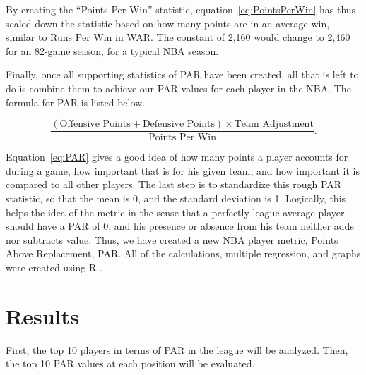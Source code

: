 \documentclass[12pt]{article}
\begin{document}
By creating the ``Points Per Win'' statistic, equation~\ref{eq:PointsPerWin} 
has thus scaled down the statistic based 
on how many points are in an average win, similar to Runs Per Win in 
WAR. The constant of 2,160 would change to 2,460 for an 82-game 
season, for a typical NBA season.

Finally, once all supporting statistics of PAR have been created, all that is left to 
do is combine them to achieve our PAR values for each player in the 
NBA. The formula for PAR is listed below.

\begin{equation}
 \label{eq:PAR}
  \frac{(\text{Offensive Points} + \text{Defensive Points}) \times \text{Team Adjustment}}
  {\text{Points Per Win}}.
\end{equation}

Equation~\ref{eq:PAR} gives a good idea of how many points a player 
accounts for 
during a 
game, how important that is for 
his given team, and how important it is compared to all other players. The 
last step is to standardize this 
 rough PAR statistic, so that the mean is 0, and the standard deviation is 
1. 
Logically, this helps the idea of the 
metric in the sense that a perfectly league average player should have a 
PAR of 0, and his presence or 
absence from his team neither adds nor subtracts value. Thus, we have 
created a new NBA player metric, 
Points Above Replacement, PAR. All of the calculations, multiple 
regression, and graphs were created using R \citep{R}.
 
 
\section{Results}
First, the top 10 players in terms of PAR in the league will be analyzed. Then, the top 10 PAR values at each position will be evaluated.
\end{document}
